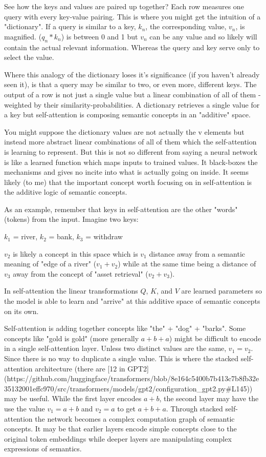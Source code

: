 See how the keys and values are paired up together? Each row measures one query with every key-value pairing. This is where you might get the intuition of a "dictionary". If a query is similar to a key, $k_n$, the corresponding value, $v_n$, is magnified. ($q_n * k_n$) is between 0 and 1 but $v_n$ can be any value and so likely will contain the actual relevant information. Whereas the query and key serve only to select the value.

Where this analogy of the dictionary loses it's significance (if you haven't already seen it), is that a query may be similar to two, or even more, different keys. The output of a row is not just a single value but a linear combination of all of them - weighted by their similarity-probabilities. A dictionary retrieves a single value for a key but self-attention is composing semantic concepts in an "additive" space.

You might suppose the dictionary values are not actually the v elements but instead more abstract linear combinations of all of them which the self-attention is learning to represent. But this is not so different from saying a neural network is like a learned function which maps inputs to trained values. It black-boxes the mechanisms and gives no incite into what is actually going on inside. It seems likely (to me) that the important concept worth focusing on in self-attention is the additive logic of semantic concepts.

As an example, remember that keys in self-attention are the other "words" (tokens) from the input. Imagine two keys:

$k_1$ = river, $k_2$ = bank, $k_3$ = withdraw

$v_2$ is likely a concept in this space which is $v_1$ distance away from a semantic meaning of "edge of a river" ($v_1 + v_2$) while at the same time being a distance of $v_3$ away from the concept of "asset retrieval" ($v_2 + v_3$).

In self-attention the linear transformations $Q$, $K$, and $V$ are learned parameters so the model is able to learn and "arrive" at this additive space of semantic concepts on its own.

Self-attention is adding together concepts like "the" + "dog" + "barks". Some concepts like "gold is gold" (more generally $a+b+a$) might be difficult to encode in a single self-attention layer. Unless two distinct values are the same, $v_1=v_2$. Since there is no way to duplicate a single value. This is where the stacked self-attention architecture (there are [12 in GPT2](https://github.com/huggingface/transformers/blob/8e164c5400b7b413c7b8fb32e35132001effc970/src/transformers/models/gpt2/configuration_gpt2.py#L145)) may be useful. While the first layer encodes $a+b$, the second layer may have the use the value $v_1=a+b$ and $v_2=a$ to get $a+b+a$. Through stacked self-attention the network becomes a complex computation graph of semantic concepts. It may be that earlier layers encode simple concepts close to the original token embeddings while deeper layers are manipulating complex expressions of semantics.

